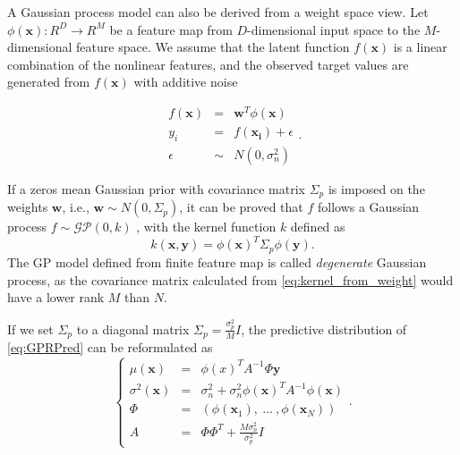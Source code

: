 A Gaussian process model can also be derived from a weight space view. Let $\phi(\bm{x}): R^D \rightarrow R^M$ be a feature map from $D$-dimensional input space to the $M$-dimensional feature space. We assume that the latent function $f(\bm{x})$ is a linear combination of the nonlinear features, and the observed target values are generated from $f(\bm{x})$ with additive noise

\begin{equation}
    \label{eq:weightspace}
    \begin{array}{lll}
        f(\bm{x}) &=&    \bm{w}^T \phi(\bm{x})   \\
        y_i       &=&    f(\bm{x_i}) + \epsilon  \\
        \epsilon  &\sim& N(0, \sigma_n^2)
    \end{array}.
\end{equation}

If a zeros mean Gaussian prior with covariance matrix $\Sigma_p$ is imposed on the weights $\bm{w}$, i.e., $\bm{w} \sim N(0, \Sigma_p)$, it can be proved that $f$ follows a Gaussian process $f \sim \mathcal{GP}(0, k)$ \cite{GPML}, with the kernel function $k$ defined as
\begin{equation}
    \label{eq:kernel_from_weight}
    k(\bm{x}, \bm{y}) = \phi(\bm{x})^T \Sigma_p \phi(\bm{y}).
\end{equation}
The GP model defined from finite feature map is called \emph{degenerate} Gaussian process, as the covariance matrix calculated from \eqref{eq:kernel_from_weight} would have a lower rank $M$ than $N$.


If we set $\Sigma_p$ to a diagonal matrix $\Sigma_p = \frac{\sigma_p^2}{M} I$\cite{lazaro2010marginalized}, the predictive distribution of \eqref{eq:GPRPred} can be reformulated as
\begin{equation}
    \left\{
        \begin{array}{lll}
            \mu(\bm{x})      &= & \phi(x)^T A^{-1} \Phi \bm{y} \\
            \sigma^2(\bm{x}) &= & \sigma_n^2 + \sigma_n^2 \phi(\bm{x})^T A^{-1} \phi(\bm{x}) \\
            \Phi             &= & (\phi(\bm{x}_1),~\dots~,\phi(\bm{x}_N)) \\
            A                &= & \Phi \Phi^T + \frac{M \sigma_n^2}{\sigma_p^2} I
        \end{array}.
    \right.
    \label{eq:DegeneratePred}
\end{equation}

